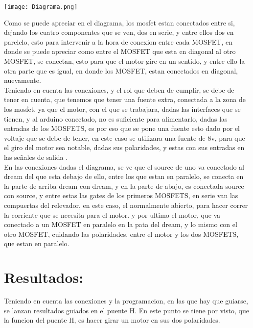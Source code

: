 \documentclass[12pt,a4paper]{article}
\begin{document}
{\begin{center}
\texttt{[image: Diagrama.png]} 
\end{center}

Como se puede apreciar en el diagrama, los mosfet estan conectados entre si, dejando los cuatro componentes que se ven, dos en serie, y entre ellos dos en parelelo, esto para intervenir a la hora de conexion entre cada MOSFET, en donde se puede apreciar como entre el MOSFET que esta en diagonal al otro MOSFET, se conectan, esto para que el motor gire en un sentido, y entre ello la otra parte que es igual, en donde los MOSFET, estan conectados en diagonal, nuevamente.\\

Teniendo en cuenta las conexiones, y el rol que deben de cumplir, se debe de tener en cuenta, que tenemos que tener una fuente extra, conectada a la zona de los mosfet, ya que el motor, con el que se trabajara, dadas las interfaces que se tienen, y al arduino conectado, no es suficiente para alimentarlo, dadas las entradas de los MOSFETS, es por eso que se pone una fuente esto dado por el voltaje que se debe de tener, en este caso se utilizara una fuente de 8v, para que el giro del motor sea notable, dadas sus polaridades, y estas con sus entradas en las señales de salida \cite{munoz2016ensenando} .\\

En las conexiones dadas el diagrama, se ve que el source de uno va conectado al dream del que esta debajo de ello, entre los que estan en paralelo, se conecta en la parte de arriba dream con dream, y en la parte de abajo, es conectada source con source, y entre estas las gates de los primeros MOSFETS, en serie van las compuertas del relevador, en este caso, el normalmente abierto, para hacer correr la corriente que se necesita para el motor. y por ultimo el motor, que va conectado a un MOSFET en paralelo en la pata del dream, y lo mismo con el otro MOSFET, cuidando las polaridades, entre el motor y los dos MOSFETS, que estan en paralelo.

\section{Resultados:}

Teniendo en cuenta las conexiones y la programacion, en las que hay que guiarse, se lanzan resultados guiados en el puente H. En este punto se tiene por visto, que la funcion del puente H, es hacer girar un motor en sus dos polaridades.\\


}
\end{document}
